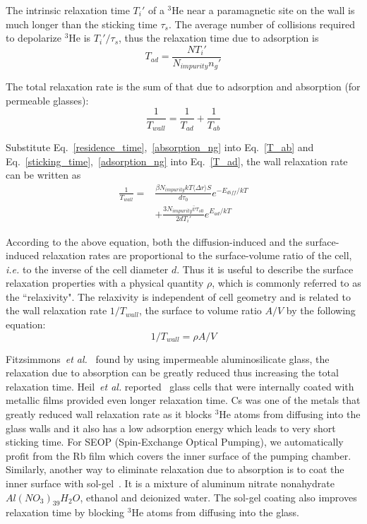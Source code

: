The intrinsic relaxation time $T_i'$ of a $^{3}$He near a paramagnetic site on the wall is much longer than the sticking time $\tau_s$. The average number of collisions required to depolarize $^{3}$He is $T_i'/\tau_s$, thus the relaxation time due to adsorption is
\begin{equation}\label{T_ad}
T_{ad}=\frac{NT_i'}{N_{impurity}n_g'}
\end{equation}

The total relaxation rate is the sum of that due to adsorption and absorption (for permeable glasses):
\begin{equation}
\frac{1}{T_{wall}}=\frac{1}{T_{ad}}+\frac{1}{T_{ab}}
\end{equation}

Substitute Eq.~\ref{residence_time},~\ref{absorption_ng} into Eq.~\ref{T_ab} and Eq.~\ref{sticking_time},~\ref{adsorption_ng} into Eq.~\ref{T_ad}, the wall relaxation rate can be written as
\begin{equation}
\begin{split}
\frac{1}{T_{wall}}=&\frac{\beta N_{impurity}kT\langle\Delta r\rangle S}{d\tau_0}e^{-E_{diff}/kT}\\
&+\frac{3N_{impurity}\bar{v}\tau_{s0}}{2dT_i'}e^{E_{ad}/kT}
\end{split}
\end{equation}

According to the above equation, both the diffusion-induced and the surface-induced relaxation rates are proportional to the surface-volume ratio of the cell, \emph{i.e.} to the inverse of the cell diameter $d$. Thus it is useful to describe the surface relaxation properties with a physical quantity $\rho$, which is commonly referred to as the ``relaxivity". The relaxivity is independent of cell geometry and is related to the wall relaxation rate $1/T_{wall}$, the surface to volume ratio $A/V$ by the following equation:
\begin{equation}
1/T_{wall}=\rho A/V
\end{equation}

Fitzsimmons~\emph{et al.}~\cite{PhysRev.179.156} found by using impermeable aluminosilicate glass, the relaxation due to absorption can be greatly reduced thus increasing the total relaxation time. Heil~\emph{et al.} reported~\cite{PhysRevA.201.337} glass cells that were internally coated with metallic films provided even longer relaxation time. Cs was one of the metals that greatly reduced wall relaxation rate as it blocks $^{3}$He atoms from diffusing into the glass walls and it also has a low adsorption energy which leads to very short sticking time. For SEOP (Spin-Exchange Optical Pumping), we automatically profit from the Rb film which covers the inner surface of the pumping chamber. Similarly, another way to eliminate relaxation due to absorption is to coat the inner surface with sol-gel~\cite{solgel}. It is a mixture of aluminum nitrate nonahydrate $Al(NO_3)_39H_2O$, ethanol and deionized water. The sol-gel coating also improves relaxation time by blocking $^{3}$He atoms from diffusing into the glass.

